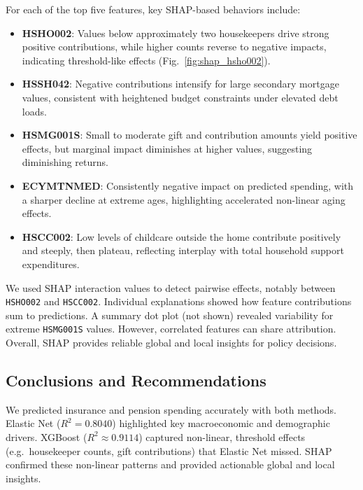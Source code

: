 \documentclass{article}
\begin{document}
For each of the top five features, key SHAP-based behaviors include:
\begin{itemize}
  \item \textbf{HSHO002}: Values below approximately two housekeepers drive strong positive contributions, while higher counts reverse to negative impacts, indicating threshold-like effects (Fig.~\ref{fig:shap_hsho002}).
  \item \textbf{HSSH042}: Negative contributions intensify for large secondary mortgage values, consistent with heightened budget constraints under elevated debt loads.
  \item \textbf{HSMG001S}: Small to moderate gift and contribution amounts yield positive effects, but marginal impact diminishes at higher values, suggesting diminishing returns.
  \item \textbf{ECYMTNMED}: Consistently negative impact on predicted spending, with a sharper decline at extreme ages, highlighting accelerated non-linear aging effects.
  \item \textbf{HSCC002}: Low levels of childcare outside the home contribute positively and steeply, then plateau, reflecting interplay with total household support expenditures.
\end{itemize}

We used SHAP interaction values to detect pairwise effects, notably between \texttt{HSHO002} and \texttt{HSCC002}. Individual explanations showed how feature contributions sum to predictions. A summary dot plot (not shown) revealed variability for extreme \texttt{HSMG001S} values. However, correlated features can share attribution. Overall, SHAP provides reliable global and local insights for policy decisions.

\subsection*{Conclusions and Recommendations}

We predicted insurance and pension spending accurately with both methods. Elastic Net ($R^2=0.8040$) highlighted key macroeconomic and demographic drivers. XGBoost ($R^2\approx0.9114$) captured non-linear, threshold effects (e.g.\ housekeeper counts, gift contributions) that Elastic Net missed. SHAP confirmed these non-linear patterns and provided actionable global and local insights.
\end{document}
